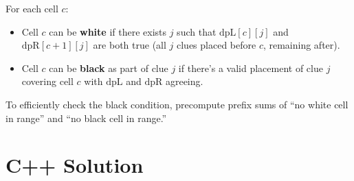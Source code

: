 \documentclass[11pt,a4paper]{article}
\begin{document}
For each cell $c$:
\begin{itemize}
  \item Cell $c$ can be \textbf{white} if there exists $j$ such that $\text{dpL}[c][j]$ and $\text{dpR}[c+1][j]$ are both true (all $j$ clues placed before $c$, remaining after).
  \item Cell $c$ can be \textbf{black} as part of clue $j$ if there's a valid placement of clue $j$ covering cell $c$ with $\text{dpL}$ and $\text{dpR}$ agreeing.
\end{itemize}

To efficiently check the black condition, precompute prefix sums of ``no white cell in range'' and ``no black cell in range.''

\section{C++ Solution}
\end{document}
